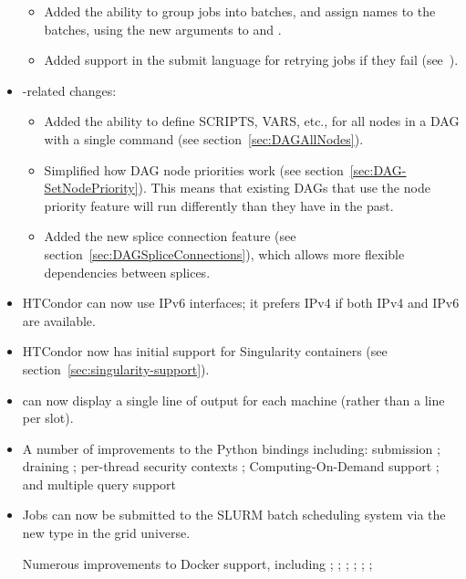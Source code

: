 \begin{itemize}
\begin{itemize}
   \item Added the ability to group jobs into batches, and assign
   names to the batches, using the new  arguments to
    and .

   \item Added support in the submit language for retrying jobs
   if they fail (see~\pageref{condor-submit-max-retries}).

  \end{itemize}

\item {}-related changes:
  \begin{itemize}

  \item Added the ability to define SCRIPTS, VARS, etc., for all nodes
  in a DAG with a single command (see section~\ref{sec:DAGAllNodes}).

  \item Simplified how DAG node priorities work
  (see section~\ref{sec:DAG-SetNodePriority}).
  This means that existing DAGs that use the node priority feature
  will run differently than they have in the past.

  \item Added the new splice connection feature
  (see section~\ref{sec:DAGSpliceConnections}), which
  allows more flexible dependencies between splices.

  \end{itemize}

\item HTCondor can now use IPv6 interfaces; it prefers IPv4 if both
IPv4 and IPv6 are available.

\item HTCondor now has initial support for Singularity containers
(see section~\ref{sec:singularity-support}).

\item {} can now display a single line of output for
each machine (rather than a line per slot).

\item A number of improvements to the Python bindings including: submission
;
draining
;
per-thread security contexts
;
Computing-On-Demand support
; and
multiple query support

\item Jobs can now be submitted to the SLURM batch scheduling system via
the new  type in the grid universe.

Numerous improvements to Docker support, including
;
;
;
;
;
;


\end{itemize}

